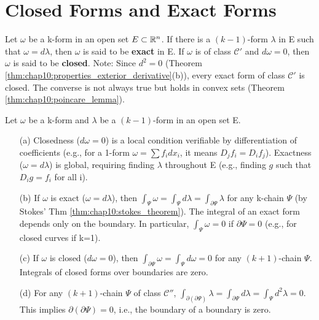 

\section{Closed Forms and Exact Forms}

\begin{definition}
  \label{def:chap10:exact_closed_forms}
  Let $\omega$ be a k-form in an open set $E \subset \mathbb{R}^n$.
  If there is a $(k-1)$-form $\lambda$ in E such that $\omega =
  d\lambda$, then $\omega$ is said to be \textbf{exact} in E.
  If $\omega$ is of class $\mathcal{C}'$ and $d\omega = 0$, then
  $\omega$ is said to be \textbf{closed}.
  Note: Since $d^2=0$ (Theorem
  \ref{thm:chap10:properties_exterior_derivative}(b)), every exact
  form of class $\mathcal{C}'$ is closed. The converse is not always
  true but holds in convex sets (Theorem \ref{thm:chap10:poincare_lemma}).
\end{definition}

\begin{remark}
  \label{rem:chap10:exact_closed_properties}
  Let $\omega$ be a k-form and $\lambda$ be a $(k-1)$-form in an open set E.
  \begin{itemize}
    \item[(a)] Closedness ($d\omega=0$) is a local condition
      verifiable by differentiation of coefficients (e.g., for a
      1-form $\omega = \sum f_i dx_i$, it means $D_j f_i = D_i f_j$).
      Exactness ($\omega=d\lambda$) is global, requiring finding
      $\lambda$ throughout E (e.g., finding $g$ such that $D_i g =
      f_i$ for all i).
    \item[(b)] If $\omega$ is exact ($\omega=d\lambda$), then
      $\int_\Psi \omega = \int_\Psi d\lambda = \int_{\partial \Psi}
      \lambda$ for any k-chain $\Psi$ (by Stokes' Thm
      \ref{thm:chap10:stokes_theorem}). The integral of an exact form
      depends only on the boundary. In particular, $\int_\Psi \omega
      = 0$ if $\partial \Psi = 0$ (e.g., for closed curves if k=1).
    \item[(c)] If $\omega$ is closed ($d\omega=0$), then
      $\int_{\partial \Psi} \omega = \int_\Psi d\omega = 0$ for any
      $(k+1)$-chain $\Psi$. Integrals of closed forms over boundaries are zero.
    \item[(d)] For any $(k+1)$-chain $\Psi$ of class $\mathcal{C}''$,
      $\int_{\partial(\partial \Psi)} \lambda = \int_{\partial \Psi}
      d\lambda = \int_\Psi d^2\lambda = 0$. This implies
      $\partial(\partial \Psi) = 0$, i.e., the boundary of a boundary is zero.
  \end{itemize}
\end{remark}


